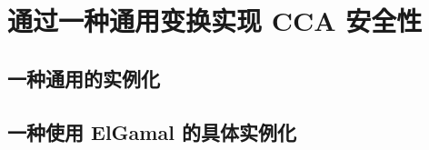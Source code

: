 \section{通过一种通用变换实现 CCA 安全性}\label{sec:12-6}

\begin{game}[单向加密]\label{game:12-6}
	
\end{game}

\begin{definition}[单向加密]\label{def:12-5}
	
\end{definition}

\begin{definition}[不可预测加密]\label{def:12-6}
	
\end{definition}

\begin{theorem}\label{theo:12-10}
	
\end{theorem}

\subsection{一种通用的实例化}\label{subsec:12-6-1}

\begin{theorem}\label{theo:12-11}
	
\end{theorem}

\subsection{一种使用 ElGamal 的具体实例化}\label{subsec:12-6-2}

\begin{theorem}\label{theo:12-12}
	
\end{theorem}

\begin{remark}[群元素验证]\label{remark:12-4}
	
\end{remark}